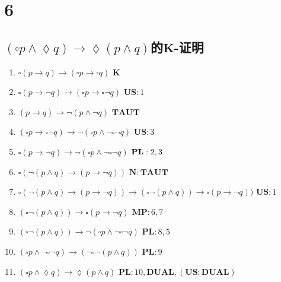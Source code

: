 \documentclass{article}
\begin{document}
\section*{6}
\subsection*{$(\square p \wedge \lozenge q) \rightarrow \lozenge (p \wedge q)$的$\mathbf{K}$-证明}
\begin{enumerate}
  \item $\square (p \rightarrow q) \rightarrow (\square p \rightarrow \square q)$ \hfill $\mathbf{K}$
  \item $\square (p \rightarrow \neg q) \rightarrow (\square p \rightarrow \square \neg q)$ \hfill $\mathbf{US}: 1$
  \item $(p \rightarrow q) \rightarrow \neg(p \wedge \neg q)$ \hfill $\mathbf{TAUT}$
  \item $(\square p \rightarrow \square \neg q) \rightarrow \neg(\square p \wedge \neg \square \neg q)$ \hfill $\mathbf{US}: 3$
  \item $\square (p \rightarrow \neg q) \rightarrow \neg(\square p \wedge \neg \square \neg q)$ $\hfill \mathbf{PL}: 2, 3$

  \item $\square(\neg (p \wedge q) \rightarrow (p \rightarrow \neg q)) $ \hfill $\mathbf{N: TAUT}$
  \item $\square(\neg (p \wedge q) \rightarrow (p \rightarrow \neg q)) \rightarrow (\square \neg (p \wedge q)) \rightarrow \square (p \rightarrow \neg q))$ \hfill $\mathbf{US}: 1$
  \item $(\square\neg (p \wedge q)) \rightarrow \square (p \rightarrow \neg q)$ \hfill $\mathbf{MP}: 6, 7$
  \item $(\square\neg (p \wedge q)) \rightarrow \neg(\square p \wedge \neg \square \neg q)$ \hfill $\mathbf{PL}: 8, 5$
  \item $(\square p \wedge \neg \square \neg q) \rightarrow (\neg \square\neg (p \wedge q))$ \hfill $\mathbf{PL}: 9$

  \item $(\square p \wedge \lozenge q) \rightarrow \lozenge (p \wedge q)$ \hfill $\mathbf{PL}: 10, \mathbf{DUAL}, (\mathbf{US: DUAL})$
\end{enumerate}
\end{document}
